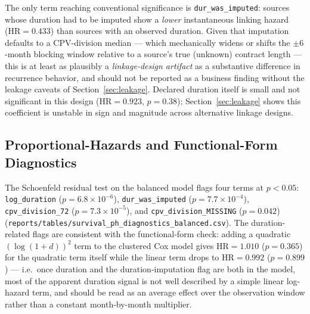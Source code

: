 \documentclass[11pt]{article}
\begin{document}
The only term reaching conventional significance is
\texttt{dur\_was\_imputed}: sources whose duration had to be imputed show a
\emph{lower} instantaneous linking hazard (HR$=0.433$) than sources with an
observed duration. Given that imputation defaults to a CPV-division median
--- which mechanically widens or shifts the $\pm 6$-month blocking window
relative to a source's true (unknown) contract length --- this is at least
as plausibly a \emph{linkage-design artifact} as a substantive difference
in recurrence behavior, and should not be reported as a business finding
without the leakage caveats of Section~\ref{sec:leakage}. Declared duration
itself is small and not significant in this design (HR$=0.923$, $p=0.38$);
Section~\ref{sec:leakage} shows this coefficient is unstable in sign and
magnitude across alternative linkage designs.

\subsection{Proportional-Hazards and Functional-Form Diagnostics}
The Schoenfeld residual test on the balanced model flags four terms at
$p<0.05$: \texttt{log\_duration} ($p=6.8\times10^{-6}$),
\texttt{dur\_was\_imputed} ($p=7.7\times10^{-4}$), \texttt{cpv\_division\_72}
($p=7.3\times10^{-5}$), and \texttt{cpv\_division\_MISSING} ($p=0.042$)
(\texttt{reports/tables/survival\_ph\_diagnostics\_balanced.csv}). The
duration-related flags are consistent with the functional-form check: adding
a quadratic $(\log(1+d))^2$ term to the clustered Cox model gives HR$=1.010$
($p=0.365$) for the quadratic term itself while the linear term drops to
HR$=0.992$ ($p=0.899$) --- i.e.\ once duration and the duration-imputation
flag are both in the model, most of the apparent duration signal is not
well described by a simple linear log-hazard term, and should be read as an
average effect over the observation window rather than a constant
month-by-month multiplier.
\end{document}
